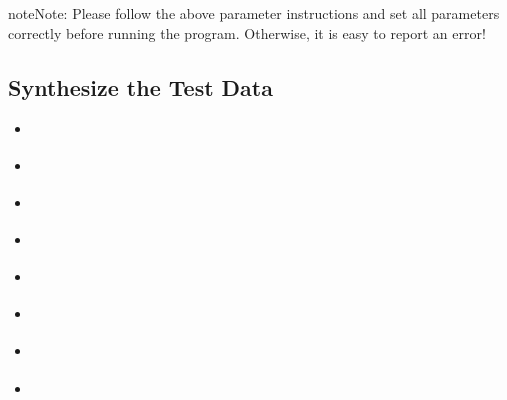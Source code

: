 \documentclass[a4paper,10pt,english,openany]{sphinxmanual}
\begin{document}
\begin{sphinxadmonition}{note}{Note:}
Please follow the above parameter instructions and set all parameters correctly before running the program.
Otherwise, it is easy to report an error!
\end{sphinxadmonition}


\subsection{Synthesize the Test Data}
\label{\detokenize{tutorials/S2_Syn_Waveform:synthesize-the-test-data}}\label{\detokenize{tutorials/S2_Syn_Waveform::doc}}
\begin{sphinxShadowBox}
\begin{itemize}
\item {} 
\label{\detokenize{tutorials/S2_Syn_Waveform:id1}}{\hyperref[\detokenize{tutorials/S2_Syn_Waveform:path}]{}}

\item {} 
\label{\detokenize{tutorials/S2_Syn_Waveform:id2}}{\hyperref[\detokenize{tutorials/S2_Syn_Waveform:source}]{}}

\item {} 
\label{\detokenize{tutorials/S2_Syn_Waveform:id3}}{\hyperref[\detokenize{tutorials/S2_Syn_Waveform:station}]{}}

\item {} 
\label{\detokenize{tutorials/S2_Syn_Waveform:id4}}{\hyperref[\detokenize{tutorials/S2_Syn_Waveform:source-time-function}]{}}

\item {} 
\label{\detokenize{tutorials/S2_Syn_Waveform:id5}}{\hyperref[\detokenize{tutorials/S2_Syn_Waveform:filter}]{}}

\item {} 
\label{\detokenize{tutorials/S2_Syn_Waveform:id6}}{\hyperref[\detokenize{tutorials/S2_Syn_Waveform:add-noise}]{}}

\item {} 
\label{\detokenize{tutorials/S2_Syn_Waveform:id7}}{\hyperref[\detokenize{tutorials/S2_Syn_Waveform:output}]{}}

\item {} 
\label{\detokenize{tutorials/S2_Syn_Waveform:id8}}{\hyperref[\detokenize{tutorials/S2_Syn_Waveform:example}]{}}

\end{itemize}
\end{sphinxShadowBox}
\end{document}
